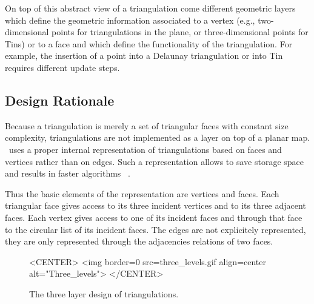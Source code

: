  On top of this  abstract  view of a triangulation come different
geometric layers which define  the geometric information
associated to a vertex (e.g.,  two-dimensional points for triangulations
in the plane, or three-dimensional points for {\sc Tin}s) or to a face
and which define the functionality of the triangulation. 
For example, the insertion of a point into a Delaunay
triangulation or into  {\sc Tin} requires different update steps.


\subsection*{Design Rationale}
Because a triangulation is merely a set of
triangular faces with constant size complexity,
triangulations are not implemented
as a layer on top of a planar map.
\cgal\ uses a proper internal
representation of triangulations based on faces and vertices
rather than on edges. Such a  representation
allows to save storage space and results in faster
algorithms~ \cite{bdty-tc-00}.

Thus the basic elements of the representation are vertices and faces.
Each triangular face gives access to its three incident vertices 
and to its three adjacent faces. 
Each vertex gives access to one of its incident faces
and through that face to the circular list of its incident faces.
The edges are not explicitely represented, they are only represented 
through the adjacencies relations of two faces.


\begin{figure}
\begin{ccTexOnly}
\begin{center}

\end{center}
\end{ccTexOnly}
\caption{The three layer design of triangulations.
\label{I1_Fig_three_levels}}
\begin{ccHtmlOnly}
<CENTER>
<img border=0 src=three_levels.gif align=center alt="Three_levels">
</CENTER>
\end{ccHtmlOnly}
\end{figure}



